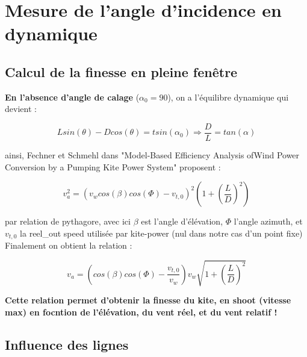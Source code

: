 \chapter{Mesure de l'angle d'incidence en dynamique}
\label{ch:Ch3}

\section{Calcul de la finesse en pleine fenêtre} 
\label{sec:Ch3.1}

\textbf{En l'absence d'angle de calage} ($\alpha_0 = 90$\textdegree), on a l'équilibre dynamique qui devient :
\begin{center}
    \begin{equation}
        L sin(\theta) - D cos(\theta) = t sin(\alpha_0) \Rightarrow \frac{D}{L} = tan(\alpha)
        \label{eq : l_over_d}
    \end{equation}
\end{center}

ainsi, Fechner et Schmehl dans "Model-Based Efficiency Analysis ofWind Power Conversion by a Pumping Kite Power System" proposent : 

\begin{center}
    \begin{equation}
        v_a^2 = (v_w cos(\beta) cos(\Phi) - v_{t,0})^2( 1 + (\frac{L}{D})^2)
    \end{equation}
\end{center}

par relation de pythagore, avec ici $\beta$ est l'angle d'élévation, $\Phi$ l'angle azimuth, et $v_{t,0}$ la reel\_out speed utilisée par kite-power (nul dans notre cas d'un point fixe)\\

Finalement on obtient la relation : 
\begin{center}
    \begin{equation}
        v_a = ( cos(\beta) cos(\Phi) - \frac{v_{t,0}}{v_w}) v_w \sqrt{ 1 + (\frac{L}{D})^2}
    \end{equation}
\end{center}

\textbf{Cette relation permet d'obtenir la finesse du kite, en shoot (vitesse max) en focntion de l'élévation, du vent réel, et du vent relatif !}

\section{Influence des lignes}

